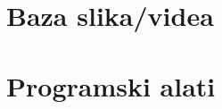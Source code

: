 \documentclass[times, utf8, seminar, numeric]{fer}
\begin{document}
\chapter{Baza slika/videa}

\chapter{Programski alati}

%
%

\begin{comment}
\begin{sazetak}
Simbolička regresija je postupak otkrivanja matematičkog izraza u skupu podataka. Daje se pregled metoda za simboličku regresiju s naglaskom na genetsko programiranje. Obrađuju se problemi kao što su domene funkcija (nisu definirane na cijelom skupu realnih brojeva). Problemi se rješavaju intervalnom aritmetikom i linearnim skaliranjem. Na kraju se ukratko opisuje mogućnost paralelizacije i primjene. 

\kljucnerijeci{genetsko programiranje, s}

\end{sazetak}

\engtitle{Application of graphics coprocessors for program execution on stream programming model}

\begin{abstract}


\keywords{GPU, StreamIt, Sponge, StreamGate, CUDA, stream model, filter, optimization, graphics card}
\end{abstract}
\end{comment}
\end{document}
